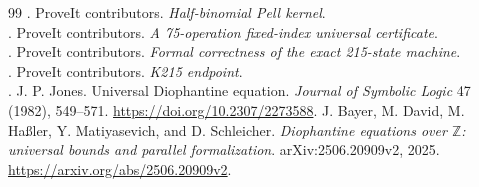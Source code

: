 \documentclass[11pt,a4paper]{article}
\theoremstyle{definition}\newtheorem{definition}[theorem]{Definition}
\theoremstyle{remark}\newtheorem{remark}[theorem]{Remark}
\begin{document}
\begin{thebibliography}{99}
.
 ProveIt contributors. \emph{Half-binomial Pell kernel}.\\
.
 ProveIt contributors. \emph{A 75-operation fixed-index
universal certificate}.\\
.
 ProveIt contributors. \emph{Formal correctness of the exact
215-state machine}.\\
.
 ProveIt contributors. \emph{K215 endpoint}.\\
.
 J. P. Jones. Universal Diophantine equation.
\emph{Journal of Symbolic Logic} 47 (1982), 549--571.
\url{https://doi.org/10.2307/2273588}.
 J. Bayer, M. David, M. Ha\ss ler, Y. Matiyasevich,
and D. Schleicher. \emph{Diophantine equations over \(\mathbb Z\):
universal bounds and parallel formalization}. arXiv:2506.20909v2, 2025.
\url{https://arxiv.org/abs/2506.20909v2}.
\end{thebibliography}
\end{document}
